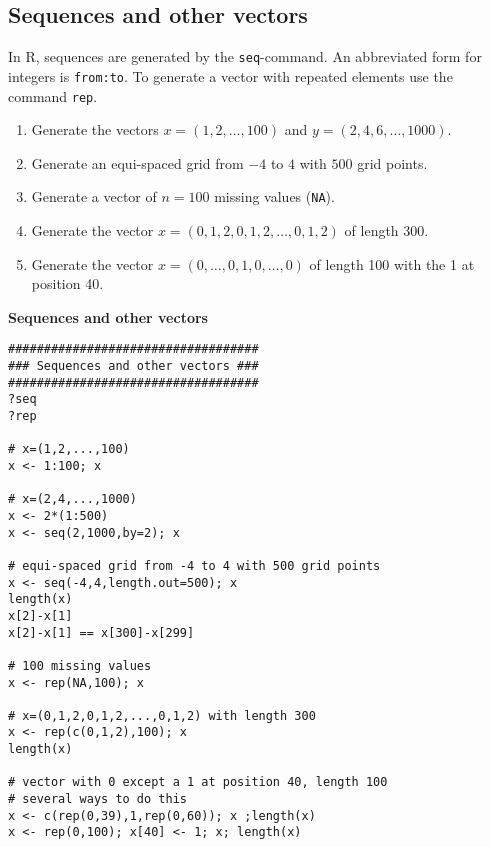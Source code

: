 \documentclass{article}
\begin{document}
\subsection{Sequences and other vectors}

In R, sequences are generated by the \texttt{seq}-command. An abbreviated form for integers is \texttt{from:to}. To generate a vector with repeated elements use the command \texttt{rep}.

\begin{enumerate}\setlength{\itemsep}{0pt}
\item Generate the vectors $x=(1,2,\ldots ,100)$ and $y=(2,4,6,\ldots ,1000)$.

\item Generate an equi-spaced grid from $-4$ to $4$ with $500$ grid points.

\item Generate a vector of $n=100$ missing values (\texttt{NA}).

\item Generate the vector $x=(0,1,2,0,1,2,\ldots ,0,1,2)$ of length 300.

\item Generate the vector $x=(0,\ldots ,0,1,0,\ldots ,0)$ of length 100 with
the 1 at position 40.
\end{enumerate}

\begin{solution}
\textbf{Sequences and other vectors}

\begin{verbatim}
###################################
### Sequences and other vectors ###
###################################
?seq
?rep

# x=(1,2,...,100)
x <- 1:100; x

# x=(2,4,...,1000)
x <- 2*(1:500)
x <- seq(2,1000,by=2); x

# equi-spaced grid from -4 to 4 with 500 grid points
x <- seq(-4,4,length.out=500); x
length(x)
x[2]-x[1]
x[2]-x[1] == x[300]-x[299]

# 100 missing values
x <- rep(NA,100); x

# x=(0,1,2,0,1,2,...,0,1,2) with length 300
x <- rep(c(0,1,2),100); x
length(x)

# vector with 0 except a 1 at position 40, length 100
# several ways to do this
x <- c(rep(0,39),1,rep(0,60)); x ;length(x)
x <- rep(0,100); x[40] <- 1; x; length(x)
\end{verbatim}
\end{solution}
\end{document}
